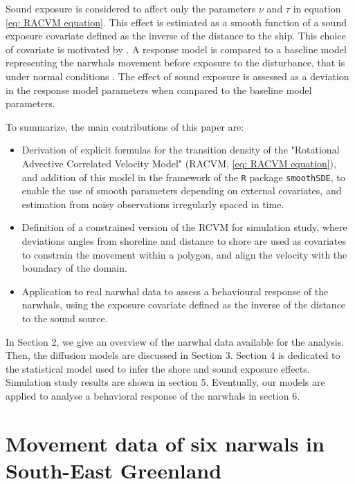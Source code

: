 \documentclass[11pt]{article}
\newcommand {\1}{\mathbb{1}}
\theoremstyle{definition}
\theoremstyle{remark}
\theoremstyle{remark}
\begin{document}
Sound exposure is considered to affect only the parameters $\nu$ and $\tau$ in equation \ref{eq: RACVM equation}. This effect is estimated as a smooth function of a sound exposure covariate defined as the inverse of the distance to the ship. This choice of covariate is motivated by \cite{heide-jorgensen_behavioral_2021}. A response model is compared to a baseline model representing the narwhals movement before exposure to the disturbance, that is under normal conditions \cite{michelot_continuous-time_2022}.
The effect of sound exposure is assessed as a deviation in the response model parameters when compared to the baseline model parameters.



To summarize, the main contributions of this paper are:
\begin{itemize}
	\item Derivation of explicit formulas for the transition density of the "Rotational Advective Correlated Velocity Model" (RACVM, \ref{eq: RACVM equation}), and addition of this model in the framework of  the \texttt{R} package \texttt{smoothSDE}, to enable the use of smooth parameters depending on external covariates, and estimation from noisy observations irregularly spaced in time.
	\item Definition of a constrained version of the RCVM for simulation study, where deviations angles from shoreline and distance to shore are used as covariates to constrain the movement within a polygon, and align the velocity with the boundary of the domain.
	\item Application to real narwhal data to assess a behavioural response of the narwhals, using the exposure covariate defined as the inverse of the distance to the sound source.
\end{itemize}

In Section 2, we give an overview of the narwhal data available for the analysis.
Then, the diffusion models are discussed in Section 3. Section 4 is dedicated to the statistical model used to infer the shore and sound exposure effects. Simulation study results are shown in section 5. Eventually, our models are applied to analyse a behavioral response of the narwhals in section 6.





\section{Movement data of six narwals in South-East Greenland}
\end{document}
